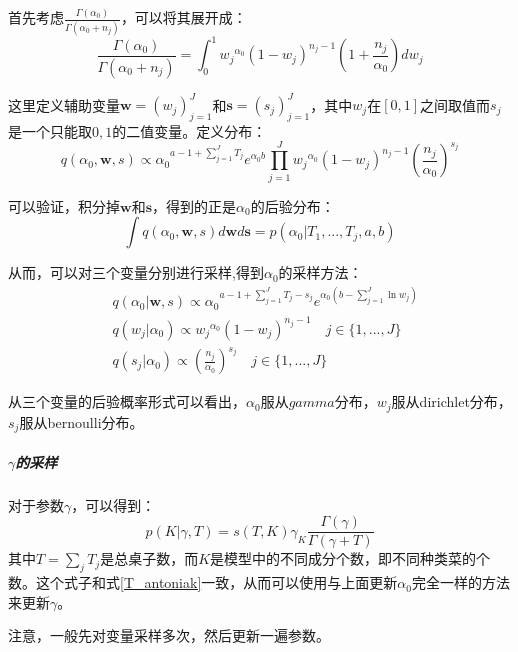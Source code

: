 首先考虑$\frac{\Gamma(\alpha_0)}{\Gamma(\alpha_0+n_j)}$，可以将其展开成：
\begin{equation}
\frac{\Gamma(\alpha_0)}{\Gamma(\alpha_0+n_j)} = \int_0^1{{w_j}^{\alpha_0}(1-w_j)^{n_j-1}(1+\frac{n_j}{\alpha_0})} d{w_j}
\end{equation} 

这里定义辅助变量${\bm w} = (w_j)_{j=1}^J$和${\bm s} = (s_j)_{j=1}^J$，其中$w_j$在$[0,1]$之间取值而$s_j$是一个只能取${0,1}$的二值变量。定义分布：
\begin{equation}
q(\alpha_0,{\bm w,s}) \propto {\alpha_0}^{a-1+\sum_{j=1}^J{T_j}} e^{\alpha_0b} \prod_{j=1}^J{{w_j}^{\alpha_0}(1-w_j)^{n_j-1}{(\frac{n_j}{\alpha_0})}^{s_j}}
\end{equation} 

可以验证，积分掉${\bm w}$和${\bm s}$，得到的正是$\alpha_0$的后验分布：
\begin{equation}
\int q(\alpha_0,{\bm w,s}) d{\bm w}d{\bm s} = p(\alpha_0|T_1,...,T_j,a,b) 
\end{equation} 

从而，可以对三个变量分别进行采样,得到$\alpha_0$的采样方法：
\begin{equation}
\begin{split}
& q(\alpha_0|{\bm w,s}) \propto {\alpha_0}^{a-1+\sum_{j=1}^J{T_j-s_j}} e^{\alpha_0(b-\sum_{j=1}^J \ln{w_j})}\\
& q(w_j|\alpha_0) \propto {w_j}^{\alpha_0}{(1-w_j)}^{n_j-1} \quad j \in \{1,...,J\}\\
& q(s_j|\alpha_0) \propto (\frac{n_j}{\alpha_0})^{s_j} \quad j \in \{1,...,J\}
\end{split}
\end{equation} 

从三个变量的后验概率形式可以看出，$\alpha_0$服从$gamma$分布，$w_j$服从dirichlet分布，$s_j$服从bernoulli分布。

\subparagraph{$\gamma$的采样}
对于参数$\gamma$，可以得到：
\begin{equation}
p(K|\gamma,T) = s(T,K) \gamma_K \frac{\Gamma(\gamma)}{\Gamma(\gamma + T) }
\end{equation} 
其中$T = \sum_j{T_j}$是总桌子数，而$K$是模型中的不同成分个数，即不同种类菜的个数。这个式子和式\eqref{T_antoniak}一致，从而可以使用与上面更新$\alpha_0$完全一样的方法来更新$\gamma$。

注意，一般先对变量采样多次，然后更新一遍参数。
